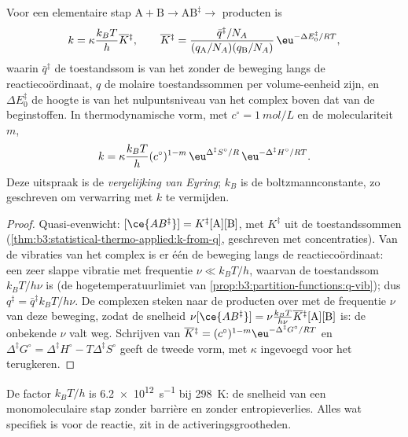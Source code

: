 \begin{theorem}\label{thm:b3:rate-theories:eyring}
Voor een elementaire stap $\mathrm{A + B} \to \mathrm{AB}^{\ddagger} \to$ producten is
\[
  k = \kappa\frac{k_BT}{h}\overline{K}{}^{\ddagger}, \qquad
  \overline{K}{}^{\ddagger} = \frac{\bar q^{\ddagger}/N_A}{(q_{\mathrm A}/N_A)(q_{\mathrm B}/N_A)}\,\eu^{-\Delta E_0^{\ddagger}/RT},
\]
waarin $\bar q^{\ddagger}$ de toestandssom is van het 
zonder de beweging langs de reactiecoördinaat, $q$ de molaire
toestandssommen per volume-eenheid zijn, en $\Delta E_0^{\ddagger}$ de
hoogte is van het nulpuntsniveau van het complex boven dat van de
beginstoffen. In thermodynamische vorm, met $c^\circ = \qty{1}{mol/L}$ en
de moleculariteit $m$,
\[
  k = \kappa\frac{k_BT}{h}(c^\circ)^{1-m}\,\eu^{\Delta^{\ddagger}S^\circ/R}\,\eu^{-\Delta^{\ddagger}H^\circ/RT}.
\]
Deze uitspraak is de \emph{vergelijking van Eyring}; $k_B$ is de
boltzmannconstante, zo geschreven om verwarring met $k$ te vermijden.
\end{theorem}

\begin{proof}
Quasi-evenwicht: $[\ce{AB^{\ddagger}}] = K^{\ddagger}[\mathrm A][\mathrm B]$, met $K^{\ddagger}$ uit de toestandssommen
(\cref{thm:b3:statistical-thermo-applied:k-from-q}, geschreven met
concentraties). Van de vibraties van het complex is er één de beweging
langs de reactiecoördinaat: een zeer slappe vibratie met frequentie $\nu \ll k_BT/h$, waarvan de
toestandssom $k_BT/h\nu$ is (de hogetemperatuurlimiet van
\cref{prop:b3:partition-functions:q-vib}); dus $q^{\ddagger} = \bar q^{\ddagger}k_BT/h\nu$. De
complexen steken naar de producten over met de frequentie $\nu$ van deze
beweging, zodat de
snelheid $\nu[\ce{AB^{\ddagger}}] = \nu\frac{k_BT}{h\nu}\overline{K}{}^{\ddagger}[\mathrm A][\mathrm B]$ is: de onbekende $\nu$ valt weg. Schrijven van
$\overline{K}{}^{\ddagger} = (c^\circ)^{1-m}\eu^{-\Delta^{\ddagger}G^\circ/RT}$ en $\Delta^{\ddagger}G^\circ = \Delta^{\ddagger}H^\circ - T\Delta^{\ddagger}S^\circ$ geeft de
tweede vorm, met $\kappa$ ingevoegd voor het terugkeren.
\end{proof}

De factor $k_BT/h$ is \qty{6.2e12}{s^{-1}} bij \qty{298}{K}: de snelheid van
een monomoleculaire stap zonder barrière en zonder entropieverlies. Alles
wat specifiek is voor de reactie, zit in de activeringsgrootheden.

